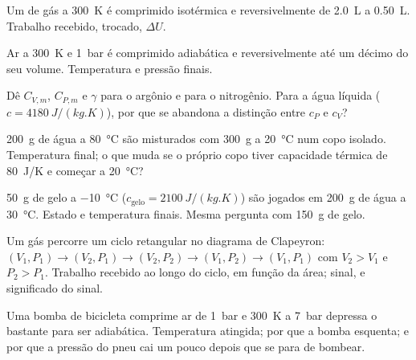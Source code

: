 \begin{exercise}[$\star$]\label{exo:b1:first-law:2}
Um  de gás a \qty{300}{K} é comprimido isotérmica e reversivelmente
de \qty{2.0}{L} a \qty{0.50}{L}. Trabalho recebido,  trocado,
$\Delta U$.
\end{exercise}

\begin{exercise}[$\star$]\label{exo:b1:first-law:3}
Ar a \qty{300}{K} e \qty{1}{bar} é comprimido adiabática e
reversivelmente até um décimo do seu volume. Temperatura e pressão finais.
\end{exercise}

\begin{exercise}[$\star$]\label{exo:b1:first-law:4}
Dê $C_{V,m}$, $C_{P,m}$ e $\gamma$ para o argônio e para o nitrogênio. Para a
água líquida ($c = \qty{4180}{J/(kg.K)}$), por que se abandona a distinção
entre $c_P$ e $c_V$?
\end{exercise}

\begin{exercise}[$\star\star$]\label{exo:b1:first-law:5}
\qty{200}{g} de água a \qty{80}{\degreeCelsius} são misturados com \qty{300}{g}
a \qty{20}{\degreeCelsius} num copo isolado. Temperatura final; o que muda se
o próprio copo tiver capacidade térmica de \qty{80}{J/K} e começar a
\qty{20}{\degreeCelsius}?
\end{exercise}

\begin{exercise}[$\star\star$]\label{exo:b1:first-law:6}
\qty{50}{g} de gelo a \qty{-10}{\degreeCelsius} ($c_{\text{gelo}} = \qty{2100}{J/(kg.K)}$)
são jogados em \qty{200}{g} de água a \qty{30}{\degreeCelsius}. Estado e
temperatura finais. Mesma pergunta com \qty{150}{g} de gelo.
\end{exercise}

\begin{exercise}[$\star\star$]\label{exo:b1:first-law:7}
Um gás percorre um ciclo retangular no diagrama de Clapeyron: $(V_1, P_1)
\to (V_2, P_1) \to (V_2, P_2) \to (V_1, P_2) \to (V_1, P_1)$ com $V_2 > V_1$ e
$P_2 > P_1$. Trabalho recebido ao longo do ciclo, em função da área;
sinal, e significado do sinal.
\end{exercise}

\begin{exercise}[$\star\star$]\label{exo:b1:first-law:8}
Uma bomba de bicicleta comprime ar de \qty{1}{bar} e \qty{300}{K} a
\qty{7}{bar} depressa o bastante para ser adiabática. Temperatura atingida; por que a
bomba esquenta; e por que a pressão do pneu cai um pouco depois que se para
de bombear.
\end{exercise}

